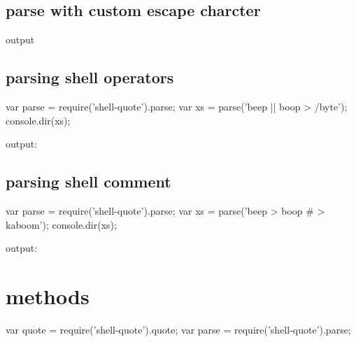 \subsection*{parse with custom escape charcter}




output


\begin{DoxyCode}
[ 'beep', '--boop=/home/robot' ]
\end{DoxyCode}


\subsection*{parsing shell operators}


\begin{DoxyCode}
var parse = require('shell-quote').parse;
var xs = parse('beep || boop > /byte');
console.dir(xs);
\end{DoxyCode}


output\+:


\begin{DoxyCode}
\end{DoxyCode}


\subsection*{parsing shell comment}


\begin{DoxyCode}
var parse = require('shell-quote').parse;
var xs = parse('beep > boop # > kaboom');
console.dir(xs);
\end{DoxyCode}


output\+:


\begin{DoxyCode}
\end{DoxyCode}


\section*{methods}


\begin{DoxyCode}
var quote = require('shell-quote').quote;
var parse = require('shell-quote').parse;
\end{DoxyCode}


